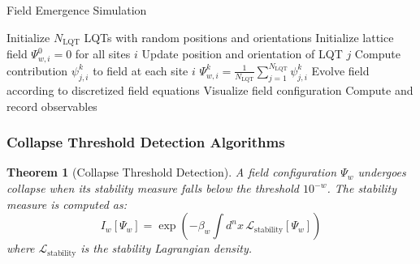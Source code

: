 \documentclass[11pt,a4paper]{article}
\newtheorem{theorem}{Theorem}[section]
\begin{document}
\begin{algorithm}
\caption{Field Emergence Simulation}
\label{alg:field_emergence}
\begin{algorithmic}[1]
    \State Initialize $N_{\text{LQT}}$ LQTs with random positions and orientations
    \State Initialize lattice field $\Psi_{w,i}^0 = 0$ for all sites $i$
            \State Update position and orientation of LQT $j$
            \State Compute contribution $\psi_{j,i}^k$ to field at each site $i$
        \EndFor
            \State $\Psi_{w,i}^k = \frac{1}{N_{\text{LQT}}} \sum_{j=1}^{N_{\text{LQT}}} \psi_{j,i}^k$
        \EndFor
        \State Evolve field according to discretized field equations
        \State Visualize field configuration
        \State Compute and record observables
    \EndFor
\EndProcedure
\end{algorithmic}
\end{algorithm}

\subsubsection{Collapse Threshold Detection Algorithms}
\label{ssubsec:collapse_threshold}

\begin{theorem}[Collapse Threshold Detection]
\label{thm:collapse_threshold_detection}
A field configuration $\Psi_w$ undergoes collapse when its stability measure falls below the threshold $10^{-w}$. The stability measure is computed as:
\begin{equation}
I_w[\Psi_w] = \exp\left(-\beta_w \int d^nx \, \mathcal{L}_{\text{stability}}[\Psi_w]\right)
\end{equation}
where $\mathcal{L}_{\text{stability}}$ is the stability Lagrangian density.
\end{theorem}
\end{document}

